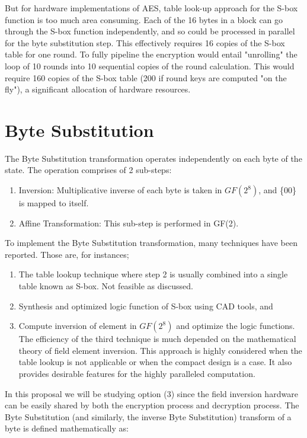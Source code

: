 \documentclass[10pt, conference, compsocconf]{IEEEtran}
\begin{document}
    But for hardware implementations of AES, table look-up approach for the S-box function is too much area consuming. Each of the 16 bytes in a block can go through the S-box function independently, and so could be processed in parallel for the byte substitution step. This effectively requires 16 copies of the S-box table for one round. To fully pipeline the encryption would entail "unrolling" the loop of 10 rounds into 10 sequential copies of the round calculation. This would require 160 copies of the S-box table (200 if round keys are computed "on the fly"), a significant allocation of hardware resources.


\section{Byte Substitution}\cite{BerkSunar}
The Byte Substitution transformation operates independently on each byte of the state. The operation comprises of 2 sub-steps:  
\begin{enumerate}
\item Inversion: Multiplicative inverse of each byte is taken in $GF(2^8)$, and \{00\} is mapped to itself.
\item Affine Transformation: This sub-step is performed in GF(2).
\end{enumerate}

To implement the Byte Substitution transformation, many techniques have been reported. Those are, for instances; 

\begin{enumerate}
\item The table lookup technique where step 2 is usually combined into a single table known as S-box. Not feasible as discussed.
\item Synthesis and optimized logic function of S-box using CAD tools, and 
\item Compute inversion of element in $GF(2^8)$ and optimize the logic functions. The efficiency of the third technique is much depended on the mathematical theory of field element inversion. This approach is highly considered when the table lookup is not applicable or when the compact design is a case. It also provides desirable features for the highly paralleled computation.
\end{enumerate}

In this proposal we will be studying option (3) since the field inversion hardware can be easily shared by both the encryption process and decryption process. The Byte Substitution (and similarly, the inverse Byte Substitution) transform of a byte is defined mathematically as:
\end{document}
